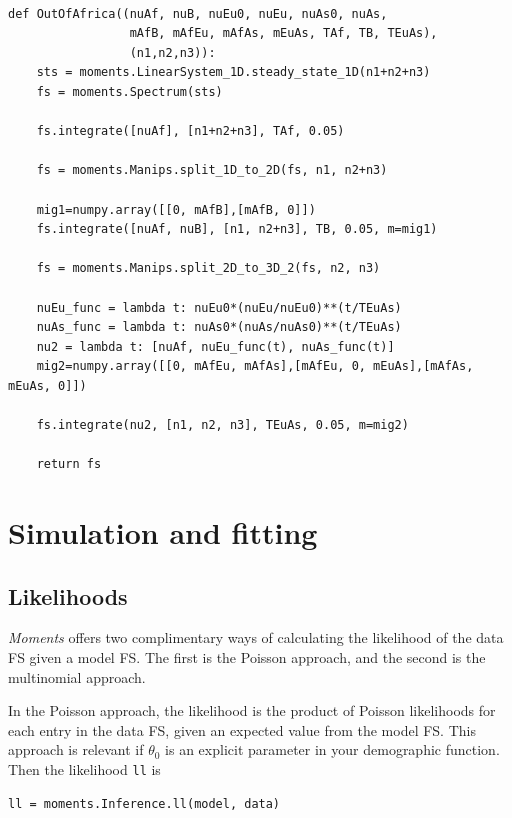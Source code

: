 \documentclass[12pt]{article}
\makeatletter
\newcommand{\py}[1]{\lstinline[language=Python, showstringspaces=False]@#1@}
\makeatother
\begin{document}
\begin{lstlisting}[caption={\textbf{Out-of-Africa model from Gutenkunst (2009):} This model involves a size change in the ancestral population, a split, another split, and then exponential growth of populations 1 and 2.}, float]

def OutOfAfrica((nuAf, nuB, nuEu0, nuEu, nuAs0, nuAs, 
                 mAfB, mAfEu, mAfAs, mEuAs, TAf, TB, TEuAs),
                 (n1,n2,n3)):
    sts = moments.LinearSystem_1D.steady_state_1D(n1+n2+n3)
    fs = moments.Spectrum(sts)

    fs.integrate([nuAf], [n1+n2+n3], TAf, 0.05)
    
    fs = moments.Manips.split_1D_to_2D(fs, n1, n2+n3)
    
    mig1=numpy.array([[0, mAfB],[mAfB, 0]])
    fs.integrate([nuAf, nuB], [n1, n2+n3], TB, 0.05, m=mig1)
    
    fs = moments.Manips.split_2D_to_3D_2(fs, n2, n3)

    nuEu_func = lambda t: nuEu0*(nuEu/nuEu0)**(t/TEuAs)
    nuAs_func = lambda t: nuAs0*(nuAs/nuAs0)**(t/TEuAs)
    nu2 = lambda t: [nuAf, nuEu_func(t), nuAs_func(t)]
    mig2=numpy.array([[0, mAfEu, mAfAs],[mAfEu, 0, mEuAs],[mAfAs, mEuAs, 0]])
    
    fs.integrate(nu2, [n1, n2, n3], TEuAs, 0.05, m=mig2)
                                
    return fs
\end{lstlisting}

\clearpage

\section{Simulation and fitting}

\subsection{Likelihoods}

\textit{Moments} offers two complimentary ways of calculating the likelihood of the data FS given a model FS.
The first is the Poisson approach, and the second is the multinomial approach.

In the Poisson approach, the likelihood is the product of Poisson likelihoods for each entry in the data FS, given an expected value from the model FS.
This approach is relevant if $\theta_0$ is an explicit parameter in your demographic function.
Then the likelihood \py{ll} is
\begin{lstlisting}
ll = moments.Inference.ll(model, data)
\end{lstlisting}
\end{document}
